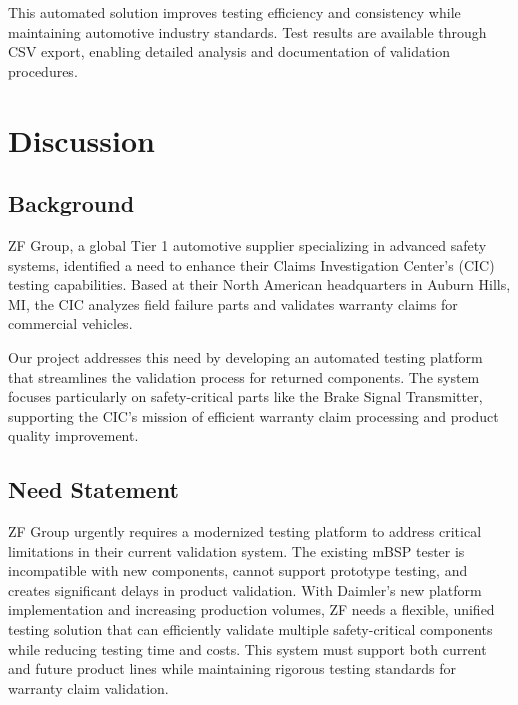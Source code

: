 \documentclass[12pt]{article}
\begin{document}
This automated solution improves testing efficiency and consistency while 
maintaining automotive industry standards. Test results are available through CSV 
export, enabling detailed analysis and documentation of validation procedures.

\section{Discussion}
\subsection{Background}

ZF Group, a global Tier 1 automotive supplier specializing in advanced safety 
systems, identified a need to enhance their Claims Investigation Center's (CIC) 
testing capabilities. Based at their North American headquarters in Auburn Hills, 
MI, the CIC analyzes field failure parts and validates warranty claims for 
commercial vehicles.

Our project addresses this need by developing an automated testing platform that 
streamlines the validation process for returned components. The system focuses 
particularly on safety-critical parts like the Brake Signal Transmitter, 
supporting the CIC's mission of efficient warranty claim processing and product 
quality improvement.


\subsection{Need Statement}
ZF Group urgently requires a modernized testing platform to address critical
limitations in their current validation system. The existing mBSP tester is
incompatible with new components, cannot support prototype testing, and creates
significant delays in product validation. With Daimler's new platform
implementation and increasing production volumes, ZF needs a flexible, unified
testing solution that can efficiently validate multiple safety-critical
components while reducing testing time and costs. This system must support both
current and future product lines while maintaining rigorous testing standards
for warranty claim validation.
\end{document}
